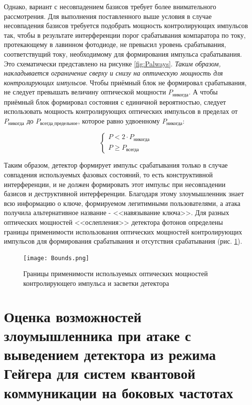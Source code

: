 Однако, вариант с несовпадением базисов требует более внимательного рассмотрения. Для выполнения поставленного выше условия в случае несовпадения базисов требуется подобрать мощность контролирующих импульсов так, чтобы в результате интерференции порог срабатывания компаратора по току, протекающему в лавинном фотодиоде, не превысил уровень срабатывания, соответствущий току, необходимому для формирования импульса срабатывания. Это схематически представлено на рисунке \ref{fig:Palways}. \textit{Таким образом, накладывается ограничение сверху и снизу на оптическую мощность для контролирующих импульсов}. Чтобы приёмный блок не формировал срабатывания, не следует превышать величину оптической мощности $P_\text{никогда}$. А чтобы приёмный блок формировал состояния с единичной вероятностью, следует использовать мощность контролирующих оптических импульсов в пределах от $P_\text{никогда}$ до $P_\text{всегда\_предельное}$, которое равно удвоенному $P_\text{никогда}$:


\[
    \begin{cases}
     P < 2 \cdot P_\text{никогда} \\
     P \geqslant P_\text{всегда}
    \end{cases}
\]




Таким образом, детектор формирует импульс срабатывания только в случае совпадения используемых фазовых состояний, то есть конструктивной интерференции, и не должен формировать этот импульс при несовпадении базисов и деструктивной интерференции. Благодаря этому злоумышленник знает всю информацию о ключе, формируемом легитимными пользователями, а атака получила альтернативное название - <<навязывание ключа>>. Для разных оптических мощностей <<ослепления>> детектора фотонов определены границы применимости использования оптических мощностей контролирующих импульсов для формирования срабатывания и отсутствия срабатывания (рис. \ref{fig:Bounds}).  


 \begin{figure}[ht]
  \centering
  \texttt{[image: Bounds.png]}
  \caption{Границы применимости используемых оптических мощностей контролирующего импульса и засветки детектора}
  \label{fig:Bounds}
\end{figure}


\section{Оценка возможностей злоумышленника при атаке с выведением детектора из режима Гейгера для систем квантовой коммуникации на боковых частотах} \label{sec:ch3/sec3}
 
